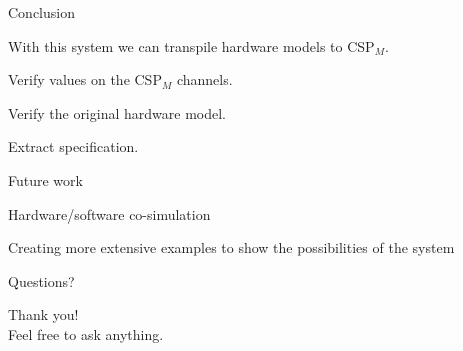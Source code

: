 \documentclass[13pt]{beamer}
\newcommand{\cspm}{CSP$_M$}
\begin{document}
%
\begin{frame}{Conclusion}
 \begin{block}{}
  With this system we can transpile hardware models to \cspm{}.
 \end{block}

 \pause

 \begin{block}{}
  Verify values on the \cspm{} channels.
 \end{block}

 \pause

 \begin{block}{}
  Verify the original hardware model.
 \end{block}

 \pause

 \begin{block}{}
  Extract specification.
 \end{block}

\end{frame}
%
\begin{frame}{Future work}
 \begin{block}{}
     Hardware/software co-simulation
 \end{block}

 \pause

 \begin{block}{}
     Creating more extensive examples to show the possibilities of the system
 \end{block}

\end{frame}
%
\begin{frame}{Questions?}
	\begin{block}{}
		Thank you!\\
            \vspace{5mm}
        Feel free to ask anything.
	\end{block}
\end{frame}
\end{document}
